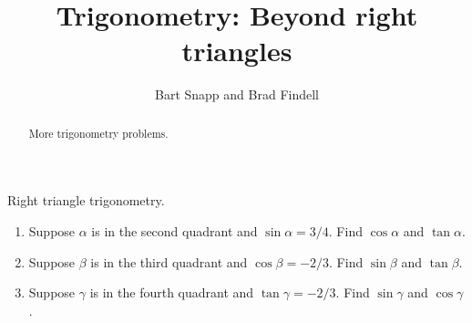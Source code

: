\documentclass[nooutcomes]{ximera}
\title{Trigonometry: Beyond right triangles}
\author{Bart Snapp and Brad Findell}
\begin{document}
\begin{abstract}
More trigonometry problems.
\end{abstract}
\maketitle


\begin{problem}
Right triangle trigonometry.  
\begin{enumerate}
\item Suppose $\alpha$ is in the second quadrant and $\sin\alpha = 3/4$.  Find $\cos\alpha$ and $\tan\alpha$.
\item Suppose $\beta$ is in the third quadrant and $\cos\beta = -2/3$.  Find $\sin\beta$ and $\tan\beta$.
\item Suppose $\gamma$ is in the fourth quadrant and $\tan\gamma = -2/3$.  Find $\sin\gamma$ and $\cos\gamma$.
\end{enumerate}
\end{problem}
\end{document}
